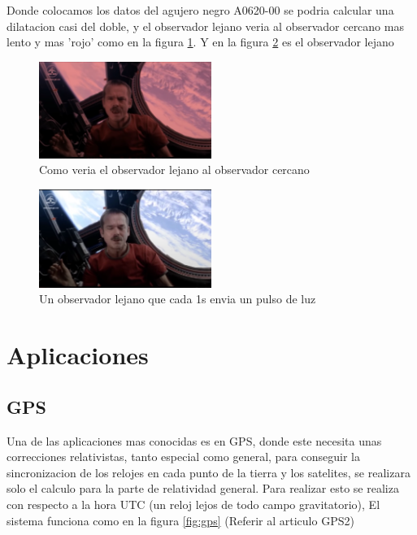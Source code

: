 \documentclass[12pt,twoside]{rif}
\begin{document}
Donde colocamos los datos del agujero negro A0620-00 se podria calcular una dilatacion casi del doble, y el observador lejano veria al observador cercano mas lento y mas 'rojo' como en la figura \ref{fig:lej}. Y en la figura \ref{fig:cerc} es el observador lejano 

	\begin{figure}[h]
	\centering
	\includegraphics[width=0.5\textwidth]{img/observador lejano.png}
	\caption{Como veria el observador lejano al observador cercano}
	\label{fig:lej}
	\end{figure}

	\begin{figure}[h]
	\centering
	\includegraphics[width=0.5\textwidth]{img/observador cercano.png}
	\caption{Un observador lejano que cada 1s envia un pulso de luz}
	\label{fig:cerc}
	\end{figure}

\newpage

\section{Aplicaciones}
	
	\subsection{GPS}
	Una de las aplicaciones mas conocidas es en GPS, donde este necesita unas correcciones relativistas, tanto especial como general, para conseguir la sincronizacion de los relojes en cada punto de la tierra y los satelites, se realizara solo el calculo para la parte de relatividad general. Para realizar esto se realiza con respecto a la hora UTC (un reloj lejos de todo campo gravitatorio), El sistema funciona como en la figura \ref{fig:gps}
(Referir al articulo GPS2)
	
\end{document}
